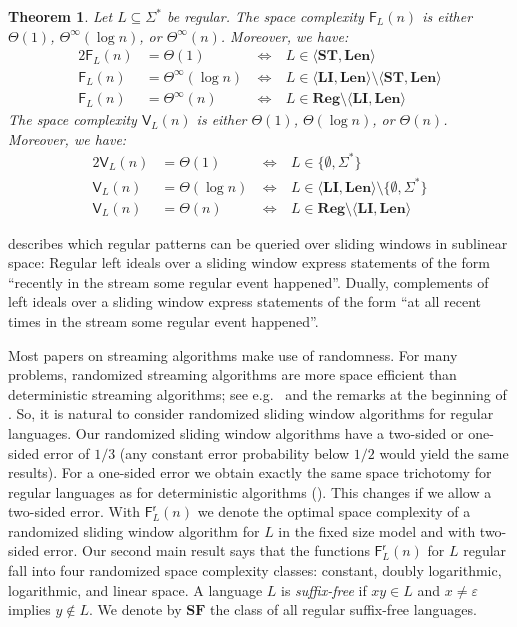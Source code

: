 \documentclass{article}\usepackage[a4paper,margin=20mm]{geometry}
\newtheorem{theorem}{Theorem}\newtheorem{lemma}[theorem]{Lemma}\newtheorem{proposition}[theorem]{Proposition}\newtheorem{corollary}[theorem]{Corollary}\newtheorem{definition}[theorem]{Definition}\newtheorem{claim}[theorem]{Claim}\newtheorem{remark}[theorem]{Remark}\newtheorem{observation}[theorem]{Observation}\newtheorem{conjecture}[theorem]{Conjecture}\newtheorem{example}[theorem]{Example}
\newcommand{\F}{\mathsf{F}}
\newcommand{\V}{\mathsf{V}}
\renewcommand{\r}{\mathsf{r}}
\newcommand{\Reg}{\mathbf{Reg}}
\newcommand{\Len}{\mathbf{Len}}
\newcommand{\LI}{\mathbf{LI}}
\newcommand{\ST}{\mathbf{ST}}
\newcommand{\SF}{\mathbf{SF}}
\newcommand{\eps}{\varepsilon}
\newcommand{\Thetainf}{\Theta^{\scriptscriptstyle{\infty}}}
\begin{document}
\begin{theorem}
	\label{thm:big-thm}
	Let $L \subseteq \Sigma^*$ be regular.
	The space complexity
	$\F_L(n)$ is either $\Theta(1)$, $\Thetainf(\log n)$, or $\Thetainf(n)$. Moreover, we have:
	\begin{alignat*}{2}
	\F_L(n) &= \Theta(1) & \ \iff \ & L \in \langle \ST, \Len \rangle \\
	\F_L(n) &= \Thetainf(\log n) & \ \iff \ & L \in \langle \LI, \Len \rangle \setminus \langle \ST, \Len \rangle \\
	\F_L(n) &= \Thetainf(n) & \ \iff \ & L \in \Reg  \setminus \langle \LI, \Len \rangle 
	\end{alignat*}
	The space complexity 
	$\V_L(n)$ is either $\Theta(1)$, $\Theta(\log n)$, or $\Theta(n)$. Moreover, we have:
	\begin{alignat*}{2}
	\V_L(n) &= \Theta(1) & \ \iff \ & L \in \{\emptyset, \Sigma^*\} \\
	\V_L(n) &= \Theta(\log n) & \ \iff \ & L \in \langle \LI, \Len \rangle \setminus \{\emptyset, \Sigma^*\} \\
	\V_L(n) &= \Theta(n) & \ \iff \ & L \in \Reg  \setminus \langle \LI, \Len \rangle
	\end{alignat*}
	\end{theorem}


 describes which regular patterns can be queried over sliding windows in sublinear space:
Regular left ideals over a sliding window express statements of the form ``recently in the stream some regular event happened''.
Dually, complements of left ideals over a sliding window express statements of the form
``at all recent times in the stream some regular event happened''.

Most papers on streaming algorithms make use of randomness. For many problems, randomized
streaming algorithms are more space efficient than deterministic streaming algorithms; see e.g.~\cite{AlonMS99}
and the remarks at the beginning of .
So, it is natural to consider
randomized sliding window algorithms for regular languages. 
Our randomized sliding window algorithms have a two-sided or one-sided error of $1/3$ (any constant error probability below $1/2$ would yield the same results).
For a one-sided error we obtain exactly the same space trichotomy for regular languages 
as for deterministic algorithms (). This changes if we allow a two-sided error.
With $\F^\r_L(n)$ we denote the optimal space complexity of a randomized
sliding window algorithm for $L$ in the fixed size model and with two-sided error. Our second main result says 
that the functions $\F^\r_L(n)$ for $L$ regular fall into four randomized space complexity classes:
constant, doubly logarithmic, logarithmic, and linear space.
A language $L$ is {\em suffix-free} if $xy \in L$ and $x \neq \eps$ implies $y \notin L$.
We denote by $\SF$ the class of all regular suffix-free languages.
\end{document}
